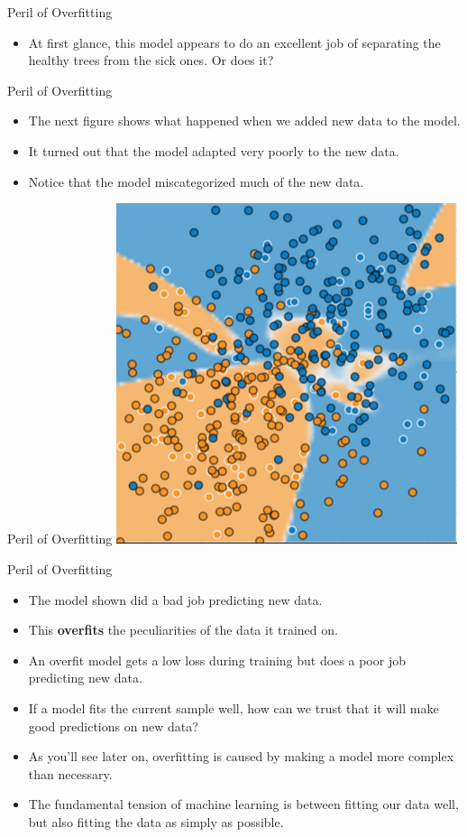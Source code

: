 \documentclass{beamer}
\begin{document}
\begin{frame}{Peril of Overfitting}
\begin{itemize}
\item At first glance, this model appears to do an excellent job of separating the healthy trees from the sick ones. Or does it?
\end{itemize}
\end{frame}

\begin{frame}{Peril of Overfitting}
\begin{itemize}
\item The next figure shows what happened when we added new data to the model. 
\item It turned out that the model adapted very poorly to the new data. 
\item Notice that the model miscategorized much of the new data.
\end{itemize}
\end{frame}

\begin{frame}{Peril of Overfitting}
\includegraphics[width=0.75\textwidth]{images/GeneralizationC.png}
\end{frame}

\begin{frame}{Peril of Overfitting}
\begin{itemize}
\item The model shown did a bad job predicting new data.
\item This {\bf overfits} the peculiarities of the data it trained on. 
\item An overfit model gets a low loss during training but does a poor job predicting new data. 
\item If a model fits the current sample well, how can we trust that it will make good predictions on new data? 
\item As you'll see later on, overfitting is caused by making a model more complex than necessary. 
\item The fundamental tension of machine learning is between fitting our data well, but also fitting the data as simply as possible.
\end{itemize}
\end{frame}
\end{document}
